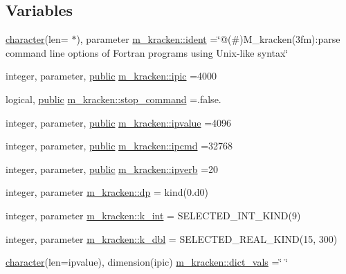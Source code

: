 \subsection*{Variables}
\begin{DoxyCompactItemize}
\item 
\hyperlink{option__stopwatch_83_8txt_abd4b21fbbd175834027b5224bfe97e66}{character}(len= $\ast$), parameter \hyperlink{namespacem__kracken_a280e9cc13c1be9621bd79a970851f3fa}{m\+\_\+kracken\+::ident} =\char`\"{}@(\#)M\+\_\+kracken(3fm)\+:parse command line options of Fortran programs using Unix-\/like syntax\char`\"{}
\item 
integer, parameter, \hyperlink{M__stopwatch_83_8txt_a2f74811300c361e53b430611a7d1769f}{public} \hyperlink{namespacem__kracken_a447be9e6b10e207b63049215d9274774}{m\+\_\+kracken\+::ipic} =4000
\item 
logical, \hyperlink{M__stopwatch_83_8txt_a2f74811300c361e53b430611a7d1769f}{public} \hyperlink{namespacem__kracken_a89f0eab0a97826df5108b9318a7bb345}{m\+\_\+kracken\+::stop\+\_\+command} =.false.
\item 
integer, parameter, \hyperlink{M__stopwatch_83_8txt_a2f74811300c361e53b430611a7d1769f}{public} \hyperlink{namespacem__kracken_a9e71724677cede703e1fb186e446349f}{m\+\_\+kracken\+::ipvalue} =4096
\item 
integer, parameter, \hyperlink{M__stopwatch_83_8txt_a2f74811300c361e53b430611a7d1769f}{public} \hyperlink{namespacem__kracken_aa2cfa3076819f58387ffb774620027c2}{m\+\_\+kracken\+::ipcmd} =32768
\item 
integer, parameter, \hyperlink{M__stopwatch_83_8txt_a2f74811300c361e53b430611a7d1769f}{public} \hyperlink{namespacem__kracken_adda44fb0845c3cec44bc5a5bb258b395}{m\+\_\+kracken\+::ipverb} =20
\item 
integer, parameter \hyperlink{namespacem__kracken_a1de91e5ca55bf4fab118936bf4fad36a}{m\+\_\+kracken\+::dp} = kind(0.d0)
\item 
integer, parameter \hyperlink{namespacem__kracken_ae51c6f835203dd09fc3be239fc9d0ce1}{m\+\_\+kracken\+::k\+\_\+int} = S\+E\+L\+E\+C\+T\+E\+D\+\_\+\+I\+N\+T\+\_\+\+K\+I\+ND(9)
\item 
integer, parameter \hyperlink{namespacem__kracken_a002abf985e8365e06a05ebde2f2b9b52}{m\+\_\+kracken\+::k\+\_\+dbl} = S\+E\+L\+E\+C\+T\+E\+D\+\_\+\+R\+E\+A\+L\+\_\+\+K\+I\+ND(15, 300)
\item 
\hyperlink{option__stopwatch_83_8txt_abd4b21fbbd175834027b5224bfe97e66}{character}(len=ipvalue), dimension(ipic) \hyperlink{namespacem__kracken_a1b8cabc9e407b8d9496f6fdb5c8da911}{m\+\_\+kracken\+::dict\+\_\+vals} =\char`\"{} \char`\"{}

\end{DoxyCompactItemize}
